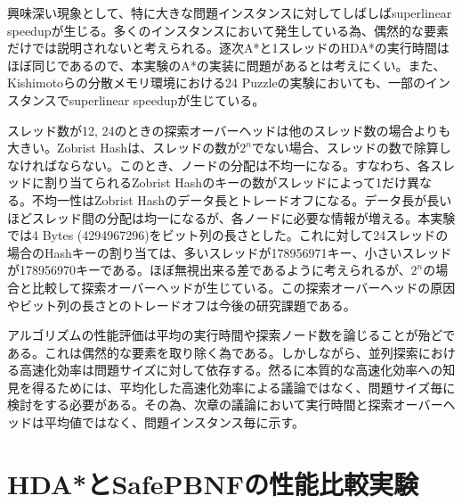 \documentclass[uplatex]{jsarticle}
\begin{document}
興味深い現象として、特に大きな問題インスタンスに対してしばしばsuperlinear speedupが生じる。多くのインスタンスにおいて発生している為、偶然的な要素だけでは説明されないと考えられる。逐次A*と1スレッドのHDA*の実行時間はほぼ同じであるので、本実験のA*の実装に問題があるとは考えにくい。また、Kishimotoらの分散メモリ環境における24 Puzzleの実験においても、一部のインスタンスでsuperlinear speedupが生じている\cite{Kishimoto2013}。
\newline

スレッド数が12, 24のときの探索オーバーヘッドは他のスレッド数の場合よりも大きい。Zobrist Hashは、スレッドの数が$2^n$でない場合、スレッドの数で除算しなければならない。このとき、ノードの分配は不均一になる。すなわち、各スレッドに割り当てられるZobrist Hashのキーの数がスレッドによって1だけ異なる。不均一性はZobrist Hashのデータ長とトレードオフになる。データ長が長いほどスレッド間の分配は均一になるが、各ノードに必要な情報が増える。本実験では4 Bytes (4294967296)をビット列の長さとした。これに対して24スレッドの場合のHashキーの割り当ては、多いスレッドが178956971キー、小さいスレッドが178956970キーである。ほぼ無視出来る差であるように考えられるが、$2^n$の場合と比較して探索オーバーヘッドが生じている。この探索オーバーヘッドの原因やビット列の長さとのトレードオフは今後の研究課題である。
\newline

アルゴリズムの性能評価は平均の実行時間や探索ノード数を論じることが殆どである。これは偶然的な要素を取り除く為である。しかしながら、並列探索における高速化効率は問題サイズに対して依存する。然るに本質的な高速化効率への知見を得るためには、平均化した高速化効率による議論ではなく、問題サイズ毎に検討をする必要がある。その為、次章の議論において実行時間と探索オーバーヘッドは平均値ではなく、問題インスタンス毎に示す。

\section{HDA*とSafePBNFの性能比較実験}
\label{sec:analysis2}
\end{document}
